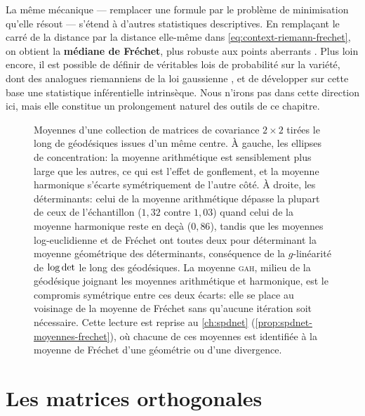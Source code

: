 \begin{remark}
  La même mécanique --- remplacer une formule par le problème de minimisation qu'elle résout --- s'étend à d'autres statistiques descriptives. En remplaçant le carré de la distance par la distance elle-même dans \cref{eq:context-riemann-frechet}, on obtient la \textbf{médiane de Fréchet}, plus robuste aux points aberrants . Plus loin encore, il est possible de définir de véritables lois de probabilité sur la variété, dont des analogues riemanniens de la loi gaussienne , et de développer sur cette base une statistique inférentielle intrinsèque. Nous n'irons pas dans cette direction ici, mais elle constitue un prolongement naturel des outils de ce chapitre.
\end{remark}

\begin{figure}[h]
  \begin{center}
    
  \end{center}
  \provMoyennesQR[.5cm]
  \caption{Moyennes d'une collection de matrices de covariance $2\times 2$
    tirées le long de géodésiques issues d'un même centre. À gauche, les
    ellipses de concentration: la moyenne arithmétique est sensiblement plus
    large que les autres, ce qui est l'effet de gonflement, et la moyenne
    harmonique s'écarte symétriquement de l'autre côté. À droite, les
    déterminants: celui de la moyenne arithmétique dépasse la plupart de ceux
    de l'échantillon ($1{,}32$ contre $1{,}03$) quand celui de la moyenne
    harmonique reste en deçà ($0{,}86$), tandis que les moyennes
    log-euclidienne et de Fréchet ont toutes deux pour déterminant la moyenne
    géométrique des déterminants, conséquence de la $g$-linéarité de
    $\log\operatorname{\operatorname{det}}$ le long des géodésiques. La moyenne \textsc{gah}, milieu de la
    géodésique joignant les moyennes arithmétique et harmonique, est le
    compromis symétrique entre ces deux écarts: elle se place au voisinage de
    la moyenne de Fréchet sans qu'aucune itération soit nécessaire. Cette
    lecture est reprise au \cref{ch:spdnet}
    (\cref{prop:spdnet-moyennes-frechet}), où chacune de ces moyennes est
    identifiée à la moyenne de Fréchet d'une géométrie ou d'une divergence.
    \provMoyennes}
  \label{fig:context-riemann-moyennes}
\end{figure}


\section{Les matrices orthogonales}
\label{sec:context-riemann-orthogonal}

